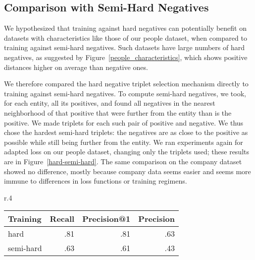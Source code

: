 \subsection{Comparison with Semi-Hard Negatives}
We hypothesized that training against hard negatives can potentially benefit on datasets with characteristics like those of our people dataset, when compared to training against semi-hard negatives.  Such datasets have large numbers of hard negatives, as suggested by Figure~\ref{people_characteristics}, which shows positive distances higher on average than negative ones.  

We therefore compared the hard negative triplet selection mechanism directly to training against semi-hard negatives.  To compute semi-hard negatives, we took, for each entity, all its positives, and found all negatives in the nearest neighborhood of that positive that were further from the entity than is the positive.  We made triplets for each such pair of positive and negative.  We thus chose the hardest semi-hard triplets: the negatives are as close to the positive as possible while still being further from the entity.  We ran experiments again for adapted loss on our people dataset, changing only the triplets used; these results are in Figure~\ref{hard-semi-hard}.  The same comparison on the company dataset showed no difference, mostly because company data seems easier and seems more immune to differences in loss functions or training regimens.

\begin{wrapfigure}{r}{.4\textwidth}
\begin{center}
\caption{Precision and Recall for hard and semi-hard training}
\label{hard-semi-hard}
{\scriptsize 
\begin{tabular}{|l|r|r|r|}
\hline 
Training & Recall & Precision@1 & Precision \\
\hline 
hard & .81 & .81 & .63 \\
\hline 
semi-hard & .63 & .61 & .43 \\
\hline 
\end{tabular}}
\end{center}
\end{wrapfigure}


